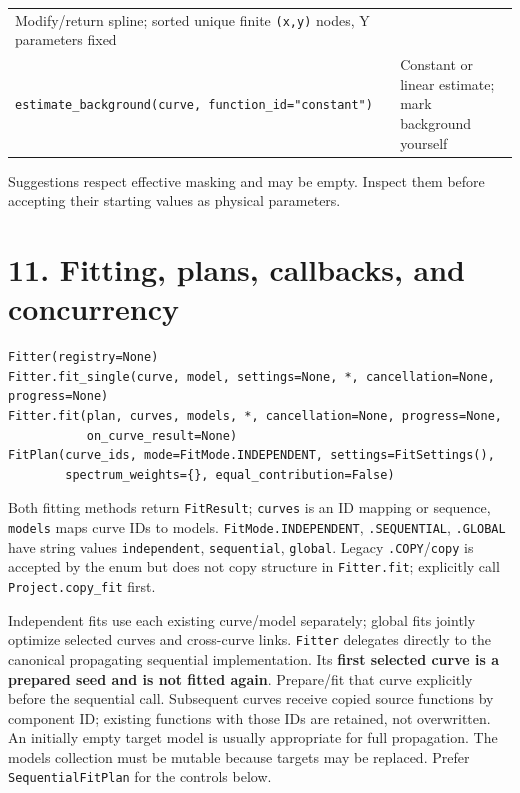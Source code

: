 \documentclass[
  10pt,
  a4paper,
  oneside]{scrreprt}
\begin{document}
\begin{longtable}[]{@{}ll@{}}
\begin{minipage}[t]{0.47\columnwidth}
Modify/return spline; sorted unique finite \texttt{(x,y)} nodes, Y
parameters fixed\strut
\end{minipage}\tabularnewline
\begin{minipage}[t]{0.47\columnwidth}\raggedright
\texttt{estimate\_background(curve,\ function\_id="constant")}\strut
\end{minipage} & \begin{minipage}[t]{0.47\columnwidth}\raggedright
Constant or linear estimate; mark background yourself\strut
\end{minipage}\tabularnewline
\bottomrule
\end{longtable}

Suggestions respect effective masking and may be empty. Inspect them
before accepting their starting values as physical parameters.

\hypertarget{fitting-plans-callbacks-and-concurrency}{%
\section{11. Fitting, plans, callbacks, and
concurrency}\label{fitting-plans-callbacks-and-concurrency}}

\begin{verbatim}
Fitter(registry=None)
Fitter.fit_single(curve, model, settings=None, *, cancellation=None, progress=None)
Fitter.fit(plan, curves, models, *, cancellation=None, progress=None,
           on_curve_result=None)
FitPlan(curve_ids, mode=FitMode.INDEPENDENT, settings=FitSettings(),
        spectrum_weights={}, equal_contribution=False)
\end{verbatim}

Both fitting methods return \texttt{FitResult}; \texttt{curves} is an ID
mapping or sequence, \texttt{models} maps curve IDs to models.
\texttt{FitMode.INDEPENDENT}, \texttt{.SEQUENTIAL}, \texttt{.GLOBAL}
have string values \texttt{independent}, \texttt{sequential},
\texttt{global}. Legacy \texttt{.COPY}/\texttt{copy} is accepted by the
enum but does not copy structure in \texttt{Fitter.fit}; explicitly call
\texttt{Project.copy\_fit} first.

Independent fits use each existing curve/model separately; global fits
jointly optimize selected curves and cross-curve links. \texttt{Fitter}
delegates directly to the canonical propagating sequential
implementation. Its \textbf{first selected curve is a prepared seed and
is not fitted again}. Prepare/fit that curve explicitly before the
sequential call. Subsequent curves receive copied source functions by
component ID; existing functions with those IDs are retained, not
overwritten. An initially empty target model is usually appropriate for
full propagation. The models collection must be mutable because targets
may be replaced. Prefer \texttt{SequentialFitPlan} for the controls
below.
\end{document}
